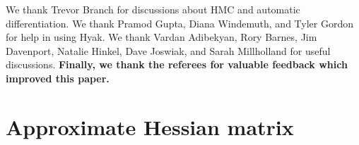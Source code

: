 \documentclass[twocolumn]{aastex63}
\begin{document}
We thank Trevor Branch for discussions about HMC and automatic differentiation.
We thank Pramod Gupta, Diana Windemuth, and Tyler Gordon for help in
using Hyak.  We thank Vardan Adibekyan, Rory Barnes, Jim Davenport, Natalie Hinkel, Dave Joswiak,
and Sarah Millholland for useful discussions. \textbf{Finally, we thank
the referees for valuable feedback which improved this paper.}

\textbf{}











\appendix

\section{Approximate Hessian matrix} \label{sec:hessian}
\end{document}
